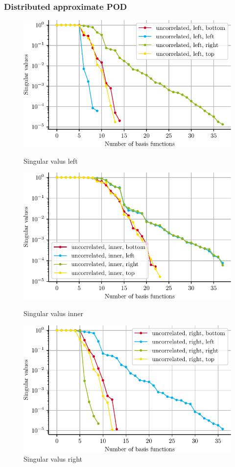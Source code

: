 \documentclass[a4paper]{eccomas_paper-2024}
\begin{document}
\subsubsection{Distributed approximate POD}

\begin{figure}[!htb]
  \includegraphics[width=\linewidth]{./figures/beam/fig_loc_svals_left.pdf}
  \caption{Singular valus left}\label{fig:loc_svals_left}
\endminipage\hfill
{}
  \includegraphics[width=\linewidth]{./figures/beam/fig_loc_svals_inner.pdf}
  \caption{Singular valus inner}\label{fig:loc_svals_inner}
\endminipage\hfill
{}%
  \includegraphics[width=\linewidth]{./figures/beam/fig_loc_svals_right.pdf}
  \caption{Singular valus right}\label{fig:loc_svals_right}
\endminipage
\end{figure}
\end{document}
